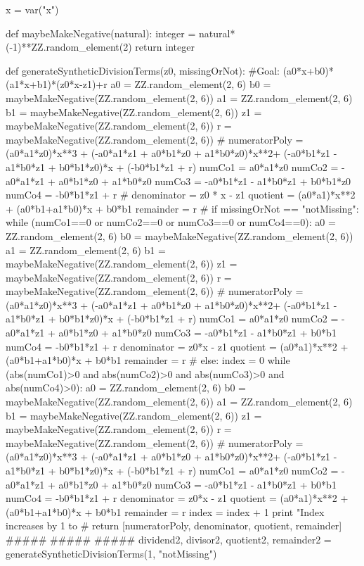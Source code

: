 \documentclass{ximera}
\begin{document}
\begin{sagesilent}
x = var("x")
 
def maybeMakeNegative(natural):
    integer = natural*(-1)**ZZ.random_element(2)
    return integer
 
def generateSyntheticDivisionTerms(z0, missingOrNot):
    #Goal: (a0*x+b0)*(a1*x+b1)*(z0*x-z1)+r
    a0 = ZZ.random_element(2, 6)
    b0 = maybeMakeNegative(ZZ.random_element(2, 6))
    a1 = ZZ.random_element(2, 6)
    b1 = maybeMakeNegative(ZZ.random_element(2, 6))
    z1 = maybeMakeNegative(ZZ.random_element(2, 6))
    r = maybeMakeNegative(ZZ.random_element(2, 6))
    #
    numeratorPoly = (a0*a1*z0)*x**3 + (-a0*a1*z1 + a0*b1*z0 + a1*b0*z0)*x**2+ (-a0*b1*z1 - a1*b0*z1 + b0*b1*z0)*x + (-b0*b1*z1 + r)
    numCo1 = a0*a1*z0
    numCo2 = -a0*a1*z1 + a0*b1*z0 + a1*b0*z0
    numCo3 = -a0*b1*z1 - a1*b0*z1 + b0*b1*z0
    numCo4 = -b0*b1*z1 + r
    #
    denominator = z0 * x - z1
    quotient = (a0*a1)*x**2 + (a0*b1+a1*b0)*x + b0*b1
    remainder = r
    #
    if missingOrNot == "notMissing":
        while (numCo1==0 or numCo2==0 or numCo3==0 or numCo4==0):
            a0 = ZZ.random_element(2, 6)
            b0 = maybeMakeNegative(ZZ.random_element(2, 6))
            a1 = ZZ.random_element(2, 6)
            b1 = maybeMakeNegative(ZZ.random_element(2, 6))
            z1 = maybeMakeNegative(ZZ.random_element(2, 6))
            r = maybeMakeNegative(ZZ.random_element(2, 6))
            #
            numeratorPoly = (a0*a1*z0)*x**3 + (-a0*a1*z1 + a0*b1*z0 + a1*b0*z0)*x**2+ (-a0*b1*z1 - a1*b0*z1 + b0*b1*z0)*x + (-b0*b1*z1 + r)
            numCo1 = a0*a1*z0
            numCo2 = -a0*a1*z1 + a0*b1*z0 + a1*b0*z0
            numCo3 = -a0*b1*z1 - a1*b0*z1 + b0*b1
            numCo4 = -b0*b1*z1 + r
            denominator = z0*x - z1
            quotient = (a0*a1)*x**2 + (a0*b1+a1*b0)*x + b0*b1
            remainder = r
            #
    else:
        index =  0
        while (abs(numCo1)>0 and abs(numCo2)>0 and abs(numCo3)>0 and abs(numCo4)>0):
            a0 = ZZ.random_element(2, 6)
            b0 = maybeMakeNegative(ZZ.random_element(2, 6))
            a1 = ZZ.random_element(2, 6)
            b1 = maybeMakeNegative(ZZ.random_element(2, 6))
            z1 = maybeMakeNegative(ZZ.random_element(2, 6))
            r = maybeMakeNegative(ZZ.random_element(2, 6))
            #
            numeratorPoly = (a0*a1*z0)*x**3 + (-a0*a1*z1 + a0*b1*z0 + a1*b0*z0)*x**2+ (-a0*b1*z1 - a1*b0*z1 + b0*b1*z0)*x + (-b0*b1*z1 + r)
            numCo1 = a0*a1*z0
            numCo2 = -a0*a1*z1 + a0*b1*z0 + a1*b0*z0
            numCo3 = -a0*b1*z1 - a1*b0*z1 + b0*b1
            numCo4 = -b0*b1*z1 + r
            denominator = z0*x - z1
            quotient = (a0*a1)*x**2 + (a0*b1+a1*b0)*x + b0*b1
            remainder = r
            index =  index + 1
            print "Index increases by 1 to %
            #
    return [numeratorPoly, denominator, quotient, remainder]
#####
#####
#####
dividend2, divisor2, quotient2, remainder2 = generateSyntheticDivisionTerms(1, "notMissing")
 

\end{sagesilent}
\end{document}
